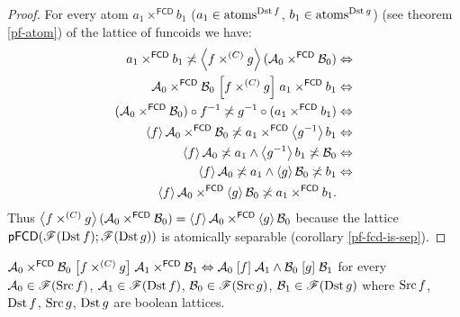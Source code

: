 \begin{proof}
For every atom $a_{1}\times^{\mathsf{FCD}}b_{1}$ ($a_{1}\in\operatorname{atoms}^{\operatorname{Dst} f}$,
$b_{1}\in\operatorname{atoms}^{\operatorname{Dst} g}$) (see theorem \ref{pf-atom}) of the lattice
of funcoids we have:
\begin{align*}
a_{1}\times^{\mathsf{FCD}}b_{1}\not\asymp\left\langle f\times^{(C)}g\right\rangle(\mathcal{A}_{0}\times^{\mathsf{FCD}}\mathcal{B}_{0}) & \Leftrightarrow\\
\mathcal{A}_{0}\times^{\mathsf{FCD}}\mathcal{B}_{0}\mathrel{\left[f\times^{(C)}g\right]}a_{1}\times^{\mathsf{FCD}}b_{1} & \Leftrightarrow\\
(\mathcal{A}_{0}\times^{\mathsf{FCD}}\mathcal{B}_{0})\circ f^{-1}\not\asymp g^{-1}\circ(a_{1}\times^{\mathsf{FCD}}b_{1}) & \Leftrightarrow\\
\left\langle f\right\rangle\mathcal{A}_{0}\times^{\mathsf{FCD}}\mathcal{B}_{0}\not\asymp a_{1}\times^{\mathsf{FCD}}\left\langle g^{-1}\right\rangle b_{1} & \Leftrightarrow\\
\left\langle f\right\rangle\mathcal{A}_{0}\not\asymp a_{1}\land\left\langle g^{-1}\right\rangle b_{1}\not\asymp\mathcal{B}_{0} & \Leftrightarrow\\
\left\langle f\right\rangle\mathcal{A}_{0}\not\asymp a_{1}\land\left\langle g\right\rangle\mathcal{B}_{0}\not\asymp b_{1} & \Leftrightarrow\\
\left\langle f\right\rangle\mathcal{A}_{0}\times^{\mathsf{FCD}}\left\langle g\right\rangle\mathcal{B}_{0}\not\asymp a_{1}\times^{\mathsf{FCD}}b_{1}.
\end{align*}
Thus $\left\langle f\times^{(C)}g\right\rangle(\mathcal{A}_{0}\times^{\mathsf{FCD}}\mathcal{B}_{0})=\left\langle f\right\rangle\mathcal{A}_{0}\times^{\mathsf{FCD}}\left\langle g\right\rangle\mathcal{B}_{0}$
because the lattice $\mathsf{pFCD}(\mathscr{F}(\operatorname{Dst} f);\mathscr{F}(\operatorname{Dst} g))$
is atomically separable (corollary \ref{pf-fcd-is-sep}).\end{proof}
\begin{cor}
$\mathcal{A}_{0}\times^{\mathsf{FCD}}\mathcal{B}_{0}\mathrel{\left[f\times^{(C)}g\right]}\mathcal{A}_{1}\times^{\mathsf{FCD}}\mathcal{B}_{1}\Leftrightarrow\mathcal{A}_{0}\mathrel{\left[f\right]}\mathcal{A}_{1}\wedge\mathcal{B}_{0}\mathrel{\left[g\right]}\mathcal{B}_{1}$
for every $\mathcal{A}_{0}\in\mathscr{F}(\operatorname{Src} f)$, $\mathcal{A}_{1}\in\mathscr{F}(\operatorname{Dst} f)$,
$\mathcal{B}_{0}\in\mathscr{F}(\operatorname{Src} g)$, $\mathcal{B}_{1}\in\mathscr{F}(\operatorname{Dst} g)$
where $\operatorname{Src} f$, $\operatorname{Dst} f$, $\operatorname{Src} g$, $\operatorname{Dst} g$ are boolean lattices.\end{cor}
